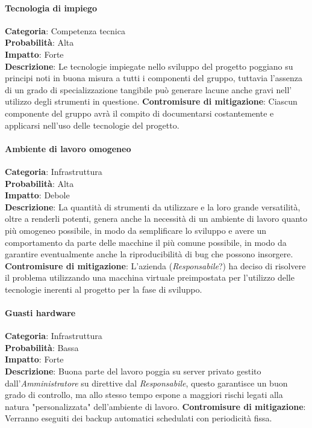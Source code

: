\documentclass{scalatekids-article}
\begin{document}
\paragraph{Tecnologia di impiego}
\textbf{Categoria}: Competenza tecnica\\
\textbf{Probabilità}: Alta\\
\textbf{Impatto}: Forte\\
\textbf{Descrizione}: Le tecnologie impiegate nello sviluppo del progetto poggiano su principi noti in buona misura a tutti
i componenti del gruppo, tuttavia l'assenza di un grado di specializzazione tangibile può generare lacune anche gravi nell' utilizzo
degli strumenti in questione.
\textbf{Contromisure di mitigazione}: Ciascun componente del gruppo avrà il compito di documentarsi costantemente e applicarsi
nell'uso delle tecnologie del progetto.
\paragraph{Ambiente di lavoro omogeneo}
\textbf{Categoria}: Infrastruttura\\
\textbf{Probabilità}: Alta\\
\textbf{Impatto}: Debole\\
\textbf{Descrizione}: La quantità di strumenti da utilizzare e la loro grande versatilità, oltre a renderli potenti, genera anche
la necessità di un ambiente di lavoro quanto più omogeneo possibile, in modo da semplificare lo sviluppo e avere un comportamento
da parte delle macchine il più comune possibile, in modo da garantire eventualmente anche la riproducibilità di bug che possono
insorgere.
\textbf{Contromisure di mitigazione}: L'azienda (\textit{Responsabile}?) ha deciso di risolvere il problema utilizzando una macchina virtuale
preimpostata per l'utilizzo delle tecnologie inerenti al progetto per la fase di sviluppo.
\paragraph{Guasti hardware}
\textbf{Categoria}: Infrastruttura\\
\textbf{Probabilità}: Bassa\\
\textbf{Impatto}: Forte\\
\textbf{Descrizione}: Buona parte del lavoro poggia su server privato gestito dall'\textit{Amministratore} su direttive dal \textit{Responsabile},
questo garantisce un buon grado di controllo, ma allo stesso tempo espone a maggiori rischi legati alla natura "personalizzata" dell'ambiente di lavoro.
\textbf{Contromisure di mitigazione}: Verranno eseguiti dei backup automatici schedulati con periodicità fissa.
\end{document}
